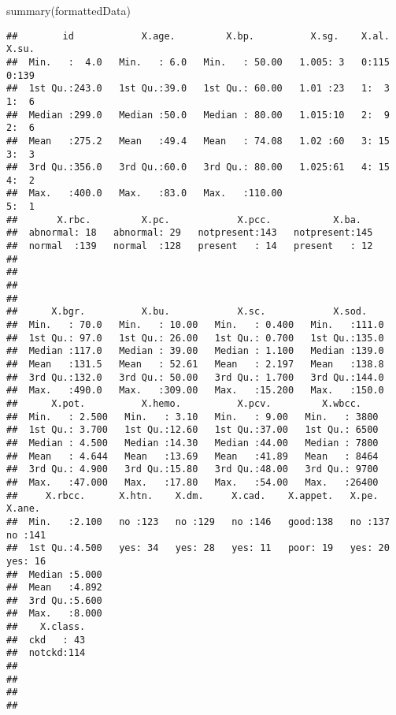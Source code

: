 \documentclass[
]{article}
\newenvironment{Shaded}{\begin{snugshade}}{\end{snugshade}}
\newcommand{\FunctionTok}[1]{\textcolor[rgb]{0.00,0.00,0.00}{#1}}
\newcommand{\NormalTok}[1]{#1}
\begin{document}
\begin{Shaded}
\begin{Highlighting}[]
\FunctionTok{summary}\NormalTok{(formattedData)}
\end{Highlighting}
\end{Shaded}

\begin{verbatim}
##        id            X.age.         X.bp.          X.sg.    X.al.   X.su.  
##  Min.   :  4.0   Min.   : 6.0   Min.   : 50.00   1.005: 3   0:115   0:139  
##  1st Qu.:243.0   1st Qu.:39.0   1st Qu.: 60.00   1.01 :23   1:  3   1:  6  
##  Median :299.0   Median :50.0   Median : 80.00   1.015:10   2:  9   2:  6  
##  Mean   :275.2   Mean   :49.4   Mean   : 74.08   1.02 :60   3: 15   3:  3  
##  3rd Qu.:356.0   3rd Qu.:60.0   3rd Qu.: 80.00   1.025:61   4: 15   4:  2  
##  Max.   :400.0   Max.   :83.0   Max.   :110.00                      5:  1  
##       X.rbc.         X.pc.            X.pcc.           X.ba.    
##  abnormal: 18   abnormal: 29   notpresent:143   notpresent:145  
##  normal  :139   normal  :128   present   : 14   present   : 12  
##                                                                 
##                                                                 
##                                                                 
##                                                                 
##      X.bgr.          X.bu.            X.sc.            X.sod.     
##  Min.   : 70.0   Min.   : 10.00   Min.   : 0.400   Min.   :111.0  
##  1st Qu.: 97.0   1st Qu.: 26.00   1st Qu.: 0.700   1st Qu.:135.0  
##  Median :117.0   Median : 39.00   Median : 1.100   Median :139.0  
##  Mean   :131.5   Mean   : 52.61   Mean   : 2.197   Mean   :138.8  
##  3rd Qu.:132.0   3rd Qu.: 50.00   3rd Qu.: 1.700   3rd Qu.:144.0  
##  Max.   :490.0   Max.   :309.00   Max.   :15.200   Max.   :150.0  
##      X.pot.          X.hemo.          X.pcv.         X.wbcc.     
##  Min.   : 2.500   Min.   : 3.10   Min.   : 9.00   Min.   : 3800  
##  1st Qu.: 3.700   1st Qu.:12.60   1st Qu.:37.00   1st Qu.: 6500  
##  Median : 4.500   Median :14.30   Median :44.00   Median : 7800  
##  Mean   : 4.644   Mean   :13.69   Mean   :41.89   Mean   : 8464  
##  3rd Qu.: 4.900   3rd Qu.:15.80   3rd Qu.:48.00   3rd Qu.: 9700  
##  Max.   :47.000   Max.   :17.80   Max.   :54.00   Max.   :26400  
##     X.rbcc.      X.htn.    X.dm.     X.cad.    X.appet.   X.pe.     X.ane.   
##  Min.   :2.100   no :123   no :129   no :146   good:138   no :137   no :141  
##  1st Qu.:4.500   yes: 34   yes: 28   yes: 11   poor: 19   yes: 20   yes: 16  
##  Median :5.000                                                               
##  Mean   :4.892                                                               
##  3rd Qu.:5.600                                                               
##  Max.   :8.000                                                               
##    X.class.  
##  ckd   : 43  
##  notckd:114  
##              
##              
##              
## 
\end{verbatim}
\end{document}
